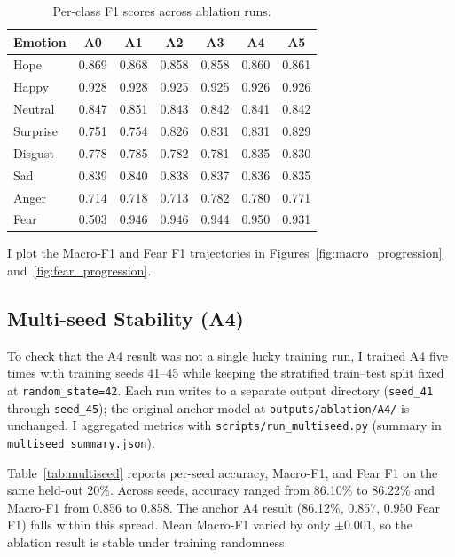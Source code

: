 \documentclass[11pt,a4paper]{article}
\begin{document}
\begin{table}[H]
\centering
\caption{Per-class F1 scores across ablation runs.}
\label{tab:perclass_complete}
\small
\begin{tabular}{@{}lcccccc@{}}
\toprule
Emotion & A0 & A1 & A2 & A3 & A4 & A5 \\
\midrule
Hope     & 0.869 & 0.868 & 0.858 & 0.858 & 0.860 & 0.861 \\
Happy    & 0.928 & 0.928 & 0.925 & 0.925 & 0.926 & 0.926 \\
Neutral  & 0.847 & 0.851 & 0.843 & 0.842 & 0.841 & 0.842 \\
Surprise & 0.751 & 0.754 & 0.826 & 0.831 & 0.831 & 0.829 \\
Disgust  & 0.778 & 0.785 & 0.782 & 0.781 & 0.835 & 0.830 \\
Sad      & 0.839 & 0.840 & 0.838 & 0.837 & 0.836 & 0.835 \\
Anger    & 0.714 & 0.718 & 0.713 & 0.782 & 0.780 & 0.771 \\
\rowcolor{red!15}
Fear     & 0.503 & 0.946 & 0.946 & 0.944 & 0.950 & 0.931 \\
\bottomrule
\end{tabular}
\end{table}

I plot the Macro-F1 and Fear F1 trajectories in Figures~\ref{fig:macro_progression} and~\ref{fig:fear_progression}.

\subsection{Multi-seed Stability (A4)}
\label{sec:multiseed}

To check that the A4 result was not a single lucky training run, I trained A4 five times with training seeds 41--45 while keeping the stratified train--test split fixed at \texttt{random\_state=42}. Each run writes to a separate output directory (\texttt{seed\_41} through \texttt{seed\_45}); the original anchor model at \texttt{outputs/ablation/A4/} is unchanged. I aggregated metrics with \texttt{scripts/run\_multiseed.py} (summary in \texttt{multiseed\_summary.json}).

Table~\ref{tab:multiseed} reports per-seed accuracy, Macro-F1, and Fear F1 on the same held-out 20\%. Across seeds, accuracy ranged from 86.10\% to 86.22\% and Macro-F1 from 0.856 to 0.858. The anchor A4 result (86.12\%, 0.857, 0.950 Fear F1) falls within this spread. Mean Macro-F1 varied by only $\pm 0.001$, so the ablation result is stable under training randomness.
\end{document}

